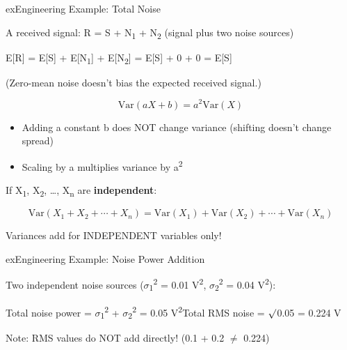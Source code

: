 \begin{PSbox}[unbreakable]{ex}{Engineering Example: Total Noise}

A received signal: R = S + N\textsubscript{1} + N\textsubscript{2} (signal plus two noise sources)

E[R] = E[S] + E[N\textsubscript{1}] + E[N\textsubscript{2}] = E[S] + 0 + 0 = E[S]

(Zero-mean noise doesn’t bias the expected received signal.)

\end{PSbox}



\[\text{Var}(aX + b) = a^2 \text{Var}(X)\]

\begin{itemize}
\tightlist
\item
  Adding a constant b does NOT change variance (shifting doesn’t change spread)
\item
  Scaling by a multiplies variance by a\textsuperscript{2}
\end{itemize}


If X\textsubscript{1}, X\textsubscript{2}, …, X\textsubscript{n} are \textbf{independent}:

\[\text{Var}(X_1 + X_2 + \cdots + X_n) = \text{Var}(X_1) + \text{Var}(X_2) + \cdots + \text{Var}(X_n)\]

\begin{PSquote}

\PSwarn{} Variances add for INDEPENDENT variables only!

\end{PSquote}

\begin{PSbox}[unbreakable]{ex}{Engineering Example: Noise Power Addition}

Two independent noise sources (\ensuremath{\sigma}\textsubscript{1}\textsuperscript{2} = 0.01 V\textsuperscript{2}, \ensuremath{\sigma}\textsubscript{2}\textsuperscript{2} = 0.04 V\textsuperscript{2}):

Total noise power = \ensuremath{\sigma}\textsubscript{1}\textsuperscript{2} + \ensuremath{\sigma}\textsubscript{2}\textsuperscript{2} = 0.05 V\textsuperscript{2}\PSbr{}Total RMS noise = \ensuremath{\surd}0.05 = 0.224 V

Note: RMS values do NOT add directly! (0.1 + 0.2 \ensuremath{\neq} 0.224)

\end{PSbox}

